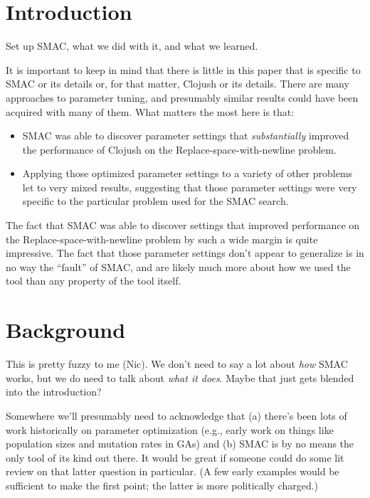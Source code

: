 \documentclass{llncs}
\begin{document}
\section{Introduction}
\label{sec:introduction}

Set up SMAC, what we did with it, and what we learned.

It is important to keep in mind that there is little in this paper that is
specific to SMAC or its details or, for that matter, Clojush or its details. 
There are many approaches to parameter
tuning, and presumably similar results could have been acquired with many of
them. What matters the most here is that:
\begin{itemize}
	\item SMAC was able to discover parameter settings that 
	\emph{substantially} improved the performance
	of Clojush on the Replace-space-with-newline problem.
	\item Applying those optimized parameter settings to a variety of other
	problems let to very mixed results, suggesting that those parameter
	settings were very specific to the particular problem used for the SMAC
	search.
\end{itemize}
The fact that SMAC was able to discover settings that improved
performance on the Replace-space-with-newline problem by such a wide margin
is quite impressive. The fact that those parameter settings don't appear to
generalize is in no way the ``fault'' of SMAC, and are likely much more 
about how we used the tool than any property of the tool itself.

\section{Background}
\label{sec:background}

This is pretty fuzzy to me (Nic). We don't need to say a lot about \emph{how}
SMAC works, but we do need to talk about \emph{what it does}. Maybe that just
gets blended into the introduction?

Somewhere we'll presumably need to acknowledge that (a) there's been lots of
work historically on parameter optimization (e.g., early work on things like
population sizes and mutation rates in GAs) and (b) SMAC is by no means the
only tool of its kind out there. It would be great if someone could do some
lit review on that latter question in particular. (A few early examples would
be sufficient to make the first point; the latter is more politically charged.)
\end{document}
